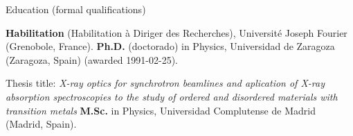 \begin{rubric}{Education (formal qualifications)}

\entry*[2004]%
    \textbf{Habilitation} (Habilitation \`a Diriger des Recherches), Universit\'e Joseph Fourier (Grenobole, France).
\entry*[1986-1991]%
	\textbf{Ph.D.} (doctorado) in Physics, Universidad de Zaragoza (Zaragoza, Spain) (awarded 1991-02-25).
	\par Thesis title: \emph{X-ray optics for synchrotron beamlines and aplication of X-ray absorption spectroscopies to the study of ordered and disordered materials with transition metals}
\entry*[1980-1986]%
	\textbf{M.Sc.} in Physics, Universidad Complutense de Madrid (Madrid, Spain).
%
\end{rubric}